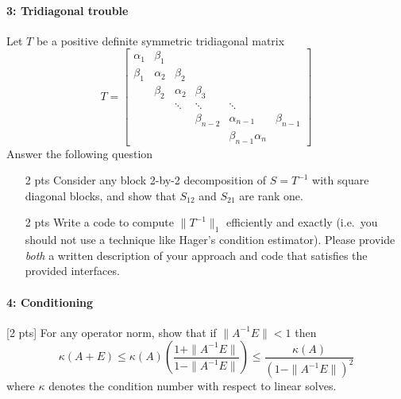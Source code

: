 \documentclass[12pt, leqno]{article} %
\begin{document}
\paragraph*{3: Tridiagonal trouble}
Let $T$ be a positive definite symmetric tridiagonal matrix
\[
T = \begin{bmatrix}
  \alpha_1 & \beta_1 \\
  \beta_1 & \alpha_2 & \beta_2 \\
  & \beta_2 & \alpha_2 & \beta_3 \\
  & & \ddots & \ddots & \ddots \\
  & & & \beta_{n-2} & \alpha_{n-1} &\beta_{n-1} \\
  & & & & \beta_{n-1} \alpha_n
  \end{bmatrix}
\]
Answer the following question
\begin{itemize}
\item[2 pts] Consider any block 2-by-2 decomposition of $S = T^{-1}$ with
  square diagonal blocks, and show that $S_{12}$ and $S_{21}$ are rank
  one.
\item[2 pts] Write a code to compute $\|T^{-1}\|_1$ efficiently and exactly
  (i.e.~you should not use a technique like Hager's condition estimator).
  Please provide {\em both} a written description of your approach and
  code that satisfies the provided interfaces.
\end{itemize}

\paragraph*{4: Conditioning}
[2 pts] For any operator norm, show that if $\|A^{-1} E\| < 1$ then
\[
  \kappa(A+E)
  \leq \kappa(A) \left( \frac{1+\|A^{-1} E\|}{1-\|A^{-1}E\|} \right)
  \leq \frac{\kappa(A)}{(1-\|A^{-1}E\|)^2}
\]
where $\kappa$ denotes the condition number with respect to linear solves.
\end{document}
